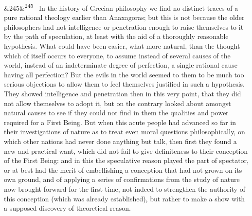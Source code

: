 \documentclass[12pt]{article}
\newcommand{\para}[1][]{\par\noindent\ifx&#1&\else\textsuperscript{\footnotesize #1}~\fi}
\begin{document}
\para[245] In the history of Grecian philosophy we find no distinct traces of a pure rational theology earlier than Anaxagoras; but this is not because the older philosophers had not intelligence or penetration enough to raise themselves to it by the path of speculation, at least with the aid of a thoroughly reasonable hypothesis. What could have been easier, what more natural, than the thought which of itself occurs to everyone, to assume instead of several causes of the world, instead of an indeterminate degree of perfection, a single rational cause having all perfection? But the evils in the world seemed to them to be much too serious objections to allow them to feel themselves justified in such a hypothesis. They showed intelligence and penetration then in this very point, that they did not allow themselves to adopt it, but on the contrary looked about amongst natural causes to see if they could not find in them the qualities and power required for a First Being. But when this acute people had advanced so far in their investigations of nature as to treat even moral questions philosophically, on which other nations had never done anything but talk, then first they found a new and practical want, which did not fail to give definiteness to their conception of the First Being: and in this the speculative reason played the part of spectator, or at best had the merit of embellishing a conception that had not grown on its own ground, and of applying a series of confirmations from the study of nature now brought forward for the first time, not indeed to strengthen the authority of this conception (which was already established), but rather to make a show with a supposed discovery of theoretical reason.
\end{document}
